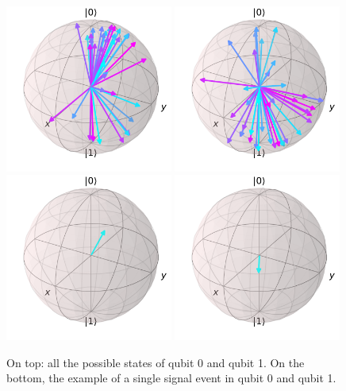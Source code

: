 \begin{figure}[!htbp]
\centering
    \includegraphics[width=0.49\textwidth]{../assets_dev/bloch1.pdf}
    \includegraphics[width=0.49\textwidth]{../assets_dev/bloch2.pdf} \\
    \includegraphics[width=0.49\textwidth]{../assets_dev/bloch_event0_1.pdf}
    \includegraphics[width=0.49\textwidth]{../assets_dev/bloch_event0_2.pdf} \\
\caption{On top: all the possible states of qubit 0 and qubit 1. On the bottom,
the example of a single signal event in qubit 0 and qubit 1.}
\label{fig:features_qubits}
\end{figure}

